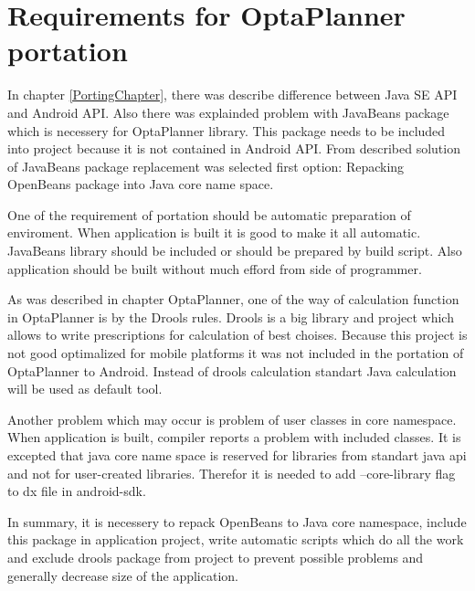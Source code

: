 
\section{Requirements for OptaPlanner portation}
In chapter \ref{PortingChapter}, there was describe difference between Java SE API and Android API. Also there was explainded problem
with JavaBeans package which is necessery for OptaPlanner library. This package needs to be included into project because it is not contained
in Android API. From described solution of JavaBeans package replacement was selected first option: Repacking OpenBeans package into Java core
name space.

One of the requirement of portation should be automatic preparation of enviroment. When application is built it is good to make it all automatic.
JavaBeans library should be included or should be prepared by build script. Also application should be built without much efford from side of programmer.

As was described in chapter OptaPlanner, one of the way of calculation function in OptaPlanner is by the Drools rules. Drools is a big library and project
which allows to write prescriptions for calculation of best choises. Because this project is not good optimalized for mobile platforms it was not included
in the portation of OptaPlanner to Android. Instead of drools calculation standart Java calculation will be used as default tool.

Another problem which may occur is problem of user classes in core namespace. When application is built, compiler reports a problem with included classes.
It is excepted that java core name space is reserved for libraries from standart java api and not for user-created libraries. Therefor it is needed to add
--core-library flag to dx file in android-sdk.

In summary, it is necessery to repack OpenBeans to Java core namespace, include this package in application project, write automatic scripts which do all
the work and exclude drools package from project to prevent possible problems and generally decrease size of the application.


